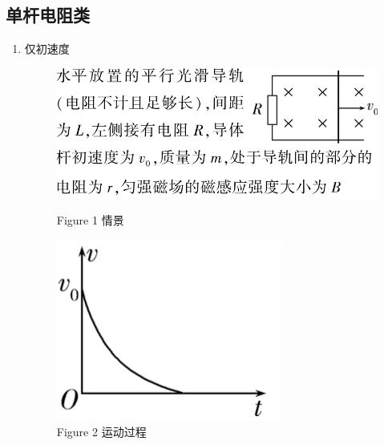 \documentclass{article}
\begin{document}
\subsection{单杆电阻类}
\begin{enumerate}[label = (\arabic*{})]
    \item 仅初速度
          \begin{figure}[H]
              \begin{minipage}{0.65\textwidth}
                  \centering
                  \includegraphics[width = \textwidth]{pictures/4.png}
                  \caption*{Figure 1 情景}
              \end{minipage}
              \hfill
              \begin{minipage}{0.3\textwidth}
                  \centering
                  \includegraphics[width = \textwidth]{pictures/5.png}
                  \caption*{Figure 2 运动过程}
              \end{minipage}
          \end{figure}


\end{enumerate}
\end{document}
